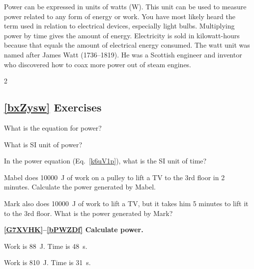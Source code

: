 \documentclass{article}
\numberwithin{equation}{section}
\numberwithin{figure}{section}
\begin{document}
Power can be expressed in units of watts (W). This unit can be used to measure power related to any form of energy or work. You have most likely heard the term used in relation to electrical devices, especially light bulbs. Multiplying power by time gives the amount of energy. Electricity is sold in kilowatt-hours because that equals the amount of electrical energy consumed. The watt unit was named after James Watt (1736--1819). He was a Scottish engineer and inventor who discovered how to coax more power out of steam engines.

\cyanhrule

\begin{multicols}{2}
\subsection*{\ref{bxZysw} Exercises}

\begin{exercise} \label{AlYFHO}
    What is the equation for power?
\end{exercise}

\begin{exercise}
    What is SI unit of power?
\end{exercise}

\begin{exercise}
    In the power equation (Eq.~\ref{k6uV1p}), what is the SI unit of time?
\end{exercise}

\begin{exercise} \label{i4fTLq}
    Mabel does \SI{10000}{J} of work on a pulley to lift a TV to the 3rd floor in 2 minutes. Calculate the power generated by Mabel.
\end{exercise}

\begin{exercise} \label{vJllNv}
    Mark also does \SI{10000}{J} of work to lift a TV, but it takes him 5 minutes to lift it to the 3rd floor. What is the power generated by Mark?
\end{exercise}

\cyanhrule

\textbf{\ref{G7XVHK}--\ref{bPWZDf} Calculate power.}

\begin{exercise} \label{G7XVHK}
    Work is \SI{88}{J}. Time is \SI{48}{s}.
\end{exercise}

\begin{exercise} \label{CJRoQV}
    Work is \SI{810}{J}. Time is \SI{31}{s}.
\end{exercise}


\end{multicols}
\end{document}
